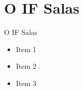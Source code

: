 \AtBeginSection[]{
	\begin{frame}
		\frametitle{}
		\tableofcontents[currentsection]
	\end{frame}
}

\section{O IF Salas}
\begin{frame}{O IF Salas}
	\begin{itemize}[<+->]
		\item Item 1
		\item Item 2
		\item Item 3
	\end{itemize}
\end{frame}